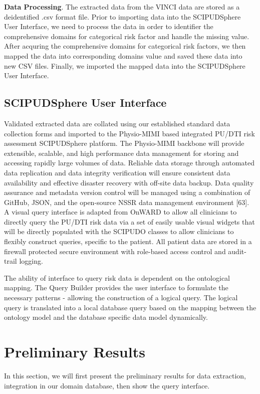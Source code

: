 \documentclass{amia}
\begin{document}
{\bf Data Processing}. The extracted data from the VINCI data are stored as a deidentified .csv format file. Prior to importing data into the SCIPUDSphere User Interface, we need to process the data in order to identifier the comprehensive domains for categorical risk factor and handle the missing value. After acquring the comprehensive domains for categorical risk factors, we then mapped the data into corresponding domains value and saved these data into new CSV files. Finally, we imported the mapped data into the SCIPUDSphere User Interface.

\subsection{SCIPUDSphere User Interface}
Validated extracted data are collated using our established standard data collection forms and imported to the Physio-MIMI based integrated PU/DTI risk assessment SCIPUDSphere platform. The Physio-MIMI backbone will provide extensible, scalable, and high performance data management for storing and accessing rapidly large volumes of data. Reliable data storage through automated data replication and data integrity verification will ensure consistent data availability and effective disaster recovery with off-site data backup. Data quality assurance and metadata version control will be managed using a combination of GitHub, JSON, and the open-source NSSR data management environment [63]. A visual query interface is adapted from OnWARD to allow all clinicians to directly query the PU/DTI risk data via a set of easily usable visual widgets that will be directly populated with the SCIPUDO classes to allow clinicians to flexibly construct queries, specific to the patient. All patient data are stored in a firewall protected secure environment with role-based access control and audit-trail logging. 

The ability of interface to query risk data is dependent on the ontological mapping. The Query Builder provides the user interface to formulate the necessary patterns - allowing the construction of a logical query. The logical query is translated into a local database query based on the mapping between the ontology model and the database specific data model dynamically.

\section{Preliminary Results}
In this section, we will first present the preliminary results for data extraction, integration in our domain database, then show the query interface. 
\end{document}
